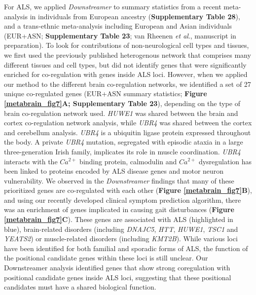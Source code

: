 For ALS, we applied \textit{Downstreamer} to summary statistics from a recent meta-analysis in individuals from European ancestry (\textbf{Supplementary Table 28}), and a trans-ethnic meta-analysis including European and Asian individuals (EUR+ASN; \textbf{Supplementary Table 23}; van Rheenen \textit{et al}., manuscript in preparation). To look for contributions of non-neurological cell types and tissues, we first used the previously published heterogenous network\cite{deelenImprovingDiagnosticYield2019} that comprises many different tissues and cell types, but did not identify genes that were significantly enriched for co-regulation with genes inside ALS loci. However, when we applied our method to the different brain co-regulation networks, we identified a set of 27 unique co-regulated genes (EUR+ASN summary statistics; \textbf{Figure \ref{metabrain_fig7}A; Supplementary Table 23}), depending on the type of brain co-regulation network used. \textit{HUWE1} was shared between the brain and cortex co-regulation network analysis, while \textit{UBR4} was shared between the cortex and cerebellum analysis. \textit{UBR4} is a ubiquitin ligase protein expressed throughout the body. A private \textit{UBR4} mutation, segregated with episodic ataxia in a large three-generation Irish family, implicates its role in muscle coordination\cite{conroyNovelLocusEpisodic2014}. \textit{UBR4} interacts with the $Ca^{2+}$ binding protein, calmodulin and $Ca^{2+}$ dysregulation has been linked to proteins encoded by ALS disease genes and motor neuron vulnerability\cite{lealCalciumDysregulationLinks2015}. We observed in the \textit{Downstreamer} findings that many of these prioritized genes are co-regulated with each other (\textbf{Figure \ref{metabrain_fig7}B}), and using our recently developed clinical symptom prediction algorithm\cite{deelenImprovingDiagnosticYield2019}, there was an enrichment of genes implicated in causing gait disturbances (\textbf{Figure \ref{metabrain_fig7}C}). These genes are associated with ALS (highlighted in blue), brain-related disorders (including \textit{DNAJC5}, \textit{HTT}, \textit{HUWE1}, \textit{TSC1} and \textit{YEATS2}) or muscle-related disorders (including \textit{KMT2B}). While various loci have been identified for both familial and sporadic forms of ALS, the function of the positional candidate genes within these loci is still unclear. Our Downstreamer analysis identified genes that show strong coregulation with positional candidate genes inside ALS loci, suggesting that these positional candidates must have a shared biological function. 

